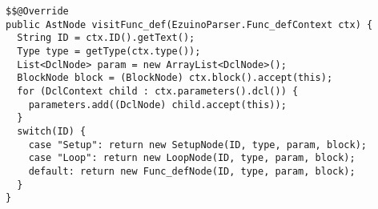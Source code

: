 \begin{lstlisting}[caption={Visit method for \texttt{Func\_defContext} in \texttt{AstBuildVisitor}}, label={code:visitFuncDef}]
$$@Override
public AstNode visitFunc_def(EzuinoParser.Func_defContext ctx) {
  String ID = ctx.ID().getText();
  Type type = getType(ctx.type());
  List<DclNode> param = new ArrayList<DclNode>();
  BlockNode block = (BlockNode) ctx.block().accept(this);
  for (DclContext child : ctx.parameters().dcl()) {
    parameters.add((DclNode) child.accept(this));
  }
  switch(ID) {
    case "Setup": return new SetupNode(ID, type, param, block);
    case "Loop": return new LoopNode(ID, type, param, block);
    default: return new Func_defNode(ID, type, param, block);
  }
}
\end{lstlisting}